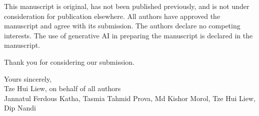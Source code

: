 \documentclass[11pt,a4paper]{article}
\begin{document}
This manuscript is original, has not been published previously, and is not
under consideration for publication elsewhere. All authors have approved the
manuscript and agree with its submission. The authors declare no competing
interests. The use of generative AI in preparing the manuscript is declared in
the manuscript.

Thank you for considering our submission.

\medskip
\noindent
Yours sincerely,\\[4pt]
Tze Hui Liew, on behalf of all authors\\
Jannatul Ferdous Katha, Tasmia Tahmid Prova, Md Kishor Morol, Tze Hui Liew,
Dip Nandi
\end{document}
